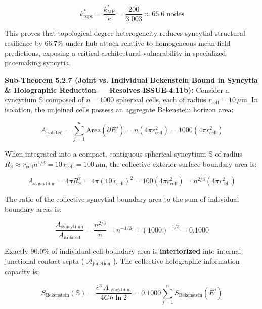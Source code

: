 \documentclass[11pt,a4paper]{article}
\theoremstyle{definition}
\theoremstyle{remark}
\begin{document}
\begin{equation}
\boxed{k^*_{\text{topo}} = \frac{k^*_{\text{MF}}}{\kappa} = \frac{200}{3.003} \approx 66.6 \text{ nodes}}
\end{equation}


This proves that topological degree heterogeneity reduces syncytial structural resilience by $66.7\%$ under hub attack relative to homogeneous mean-field predictions, exposing a critical architectural vulnerability in specialized pacemaking syncytia.

\textbf{Sub-Theorem 5.2.7 (Joint vs. Individual Bekenstein Bound in Syncytia \& Holographic Reduction — Resolves ISSUE-4.11b):}
Consider a syncytium $\mathbb{S}$ composed of $n = 1000$ spherical cells, each of radius $r_{\text{cell}} = 10\,\mu\mathrm{m}$. In isolation, the unjoined cells possess an aggregate Bekenstein horizon area:


\begin{equation}
A_{\text{isolated}} = \sum_{j=1}^n \mathrm{Area}(\partial E^j) = n \left( 4\pi r_{\text{cell}}^2 \right) = 1000 \left( 4\pi r_{\text{cell}}^2 \right)
\end{equation}


When integrated into a compact, contiguous spherical syncytium $\mathbb{S}$ of radius $R_{\mathbb{S}} \approx r_{\text{cell}} n^{1/3} = 10 \, r_{\text{cell}} = 100\,\mu\mathrm{m}$, the collective exterior surface boundary area is:


\begin{equation}
A_{\text{syncytium}} = 4\pi R_{\mathbb{S}}^2 = 4\pi (10 \, r_{\text{cell}})^2 = 100 \left( 4\pi r_{\text{cell}}^2 \right) = n^{2/3} \left( 4\pi r_{\text{cell}}^2 \right)
\end{equation}


The ratio of the collective syncytial boundary area to the sum of individual boundary areas is:


\begin{equation}
\frac{A_{\text{syncytium}}}{A_{\text{isolated}}} = \frac{n^{2/3}}{n} = n^{-1/3} = (1000)^{-1/3} = 0.1000
\end{equation}


Exactly $90.0\%$ of individual cell boundary area is \textbf{interiorized} into internal junctional contact septa ( $\mathcal{A}_{\text{junction}}$ ). The collective holographic information capacity is:


\begin{equation}
\boxed{S_{\text{Bekenstein}}(\mathbb{S}) = \frac{c^3 \, A_{\text{syncytium}}}{4 G \hbar \ln 2} = 0.1000 \sum_{j=1}^n S_{\text{Bekenstein}}(E^j)}
\end{equation}
\end{document}
